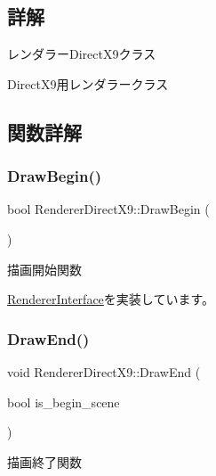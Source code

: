 \subsection{詳解}
レンダラー\+Direct\+X9クラス 

Direct\+X9用レンダラークラス 

\subsection{関数詳解}
\mbox{\label{class_renderer_direct_x9_a61fc7dc142c3d54f83152fc3bb259ff4}} 
\subsubsection{\texorpdfstring{Draw\+Begin()}{DrawBegin()}}
{\footnotesize\ttfamily bool Renderer\+Direct\+X9\+::\+Draw\+Begin (\begin{DoxyParamCaption}{ }\end{DoxyParamCaption})\hspace{0.3cm}{\ttfamily [virtual]}}



描画開始関数 



\mbox{\hyperlink{class_renderer_interface_a86a487deb4e4207a67410d00ec670fd7}{Renderer\+Interface}}を実装しています。

\mbox{\label{class_renderer_direct_x9_a8a29b6e70fa8b2f55a12c11143184ce1}} 
\subsubsection{\texorpdfstring{Draw\+End()}{DrawEnd()}}
{\footnotesize\ttfamily void Renderer\+Direct\+X9\+::\+Draw\+End (\begin{DoxyParamCaption}\item[{bool}]{is\+\_\+begin\+\_\+scene }\end{DoxyParamCaption})\hspace{0.3cm}{\ttfamily [virtual]}}



描画終了関数 


